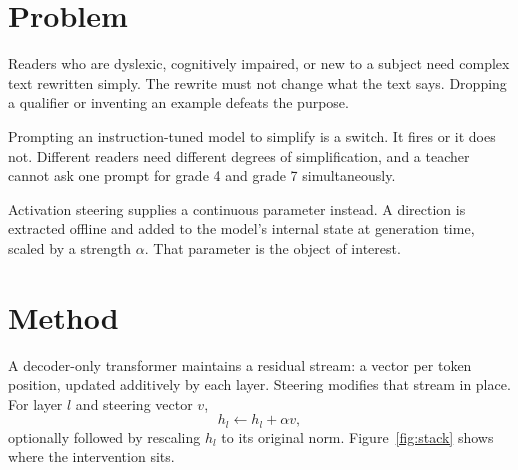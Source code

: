 \documentclass[twocolumn,10pt,a4paper]{article}
\begin{document}
\section{Problem}

Readers who are dyslexic, cognitively impaired, or new to a subject need
complex text rewritten simply. The rewrite must not change what the text says.
Dropping a qualifier or inventing an example defeats the purpose.

Prompting an instruction-tuned model to simplify is a switch. It fires or it
does not. Different readers need different degrees of simplification, and a
teacher cannot ask one prompt for grade 4 and grade 7 simultaneously.

Activation steering supplies a continuous parameter instead. A direction is
extracted offline and added to the model's internal state at generation time,
scaled by a strength $\alpha$. That parameter is the object of interest.

\section{Method}

A decoder-only transformer maintains a residual stream: a vector per token
position, updated additively by each layer. Steering modifies that stream in
place. For layer $l$ and steering vector $v$,
\begin{equation}
h_l \leftarrow h_l + \alpha v,
\label{eq:steer}
\end{equation}
optionally followed by rescaling $h_l$ to its original norm. Figure~\ref{fig:stack}
shows where the intervention sits.
\end{document}
